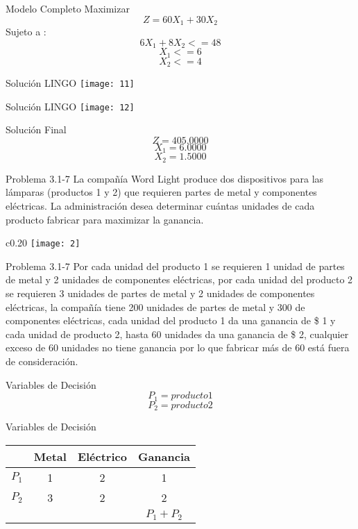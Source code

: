 \documentclass{beamer}
\begin{document}
\begin{frame}[fragile]{Modelo Completo}
Maximizar\\
\[Z = 60X_{1} + 30X_{2}\]
Sujeto a :\\
\[  6X_{1} + 8X_{2} <= 48\]
\[  X_{1} <= 6\]
\[  X_{2} <= 4\]
\end{frame}

\begin{frame}[fragile]{Soluci\'on LINGO}
\texttt{[image: 11]}
\end{frame}

\begin{frame}[fragile]{Soluci\'on LINGO}
    \texttt{[image: 12]}
\end{frame}

\begin{frame}[fragile]{Soluci\'on Final}
\[Z = 405.0000\]
\[X_{1} = 6.0000\]
\[X_{2} = 1.5000\]
\end{frame}

\begin{frame}[t,fragile]{Problema 3.1-7 }
La compañ\'ia Word Light produce dos dispositivos para las l\'amparas (productos 1 y 2) que requieren partes de metal y componentes el\'ectricas. La administraci\'on desea determinar cu\'antas unidades de cada producto fabricar para maximizar la ganancia. 
\begin{wrapfigure}{c}{0.20\textwidth}
    \centering
    \texttt{[image: 2]}
\end{wrapfigure}
\end{frame}
\begin{frame}[t,fragile]{Problema 3.1-7 }
Por cada unidad del producto 1 se requieren 1 unidad de partes de metal y 2 unidades de componentes el\'ectricas, por cada unidad del producto 2 se requieren 3 unidades de partes de metal y 2 unidades de componentes el\'ectricas, la compañ\'ia tiene 200 unidades de partes de metal y 300 de componentes el\'ectricas, cada unidad del producto 1 da una ganancia de \$ 1 y cada unidad de producto 2, hasta 60 unidades da una ganancia de \$ 2, cualquier exceso de 60 unidades no tiene ganancia por lo que fabricar m\'as de 60 est\'a fuera de consideraci\'on. \\
\end{frame}

\begin{frame}[fragile]{Variables de Decisi\'on}
\[P_{1} = producto 1\]
\[P_{2} = producto 2\]
\end{frame}
\begin{frame}[fragile]{Variables de Decisi\'on}
\begin{tabular}{|c|c|c|c|}
\hline 
  & Metal & El\'ectrico & Ganancia \\ 
\hline 
\(P_{1}\) & 1 & 2 & 1 \\ 
\hline 
\(P_{2}\) & 3 & 2 & 2 \\ 
\hline 
 &   &   & \(P_{1} + P_{2}\) \\ 
\hline 
\end{tabular} 

\end{frame}
\end{document}

